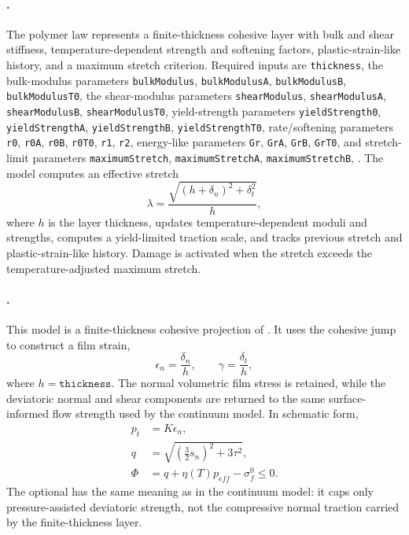 \paragraph{.}
The polymer law represents a finite-thickness cohesive layer with bulk and shear stiffness, temperature-dependent strength and softening factors, plastic-strain-like history, and a maximum stretch criterion.  Required inputs are \texttt{thickness}, the bulk-modulus parameters \texttt{bulkModulus}, \texttt{bulkModulusA}, \texttt{bulkModulusB}, \texttt{bulkModulusT0}, the shear-modulus parameters \texttt{shearModulus}, \texttt{shearModulusA}, \texttt{shearModulusB}, \texttt{shearModulusT0}, yield-strength parameters \texttt{yieldStrength0}, \texttt{yieldStrengthA}, \texttt{yieldStrengthB}, \texttt{yieldStrengthT0}, rate/softening parameters \texttt{r0}, \texttt{r0A}, \texttt{r0B}, \texttt{r0T0}, \texttt{r1}, \texttt{r2}, energy-like parameters \texttt{Gr}, \texttt{GrA}, \texttt{GrB}, \texttt{GrT0}, and stretch-limit parameters \texttt{maximumStretch}, \texttt{maximumStretchA}, \texttt{maximumStretchB}, .  The model computes an effective stretch
\begin{equation}
  \lambda = \frac{\sqrt{(h+\delta_n)^2+\delta_t^2}}{h},
  \label{eq:cz-polymer-stretch}
\end{equation}
where $h$ is the layer thickness, updates temperature-dependent moduli and strengths, computes a yield-limited traction scale, and tracks previous stretch and plastic-strain-like history.  Damage is activated when the stretch exceeds the temperature-adjusted maximum stretch.

\paragraph{.}
This model is a finite-thickness cohesive projection of .  It uses the cohesive jump to construct a film strain,
\begin{equation}
  \epsilon_n=\frac{\delta_n}{h},
  \qquad
  \gamma=\frac{\delta_t}{h},
  \label{eq:surface-polymer-cz-film-strain}
\end{equation}
where \(h=\texttt{thickness}\).  The normal volumetric film stress is retained, while the deviatoric normal and shear components are returned to the same surface-informed flow strength used by the continuum model.  In schematic form,
\begin{align}
  p_t &= K\epsilon_n,\\
  q &= \sqrt{\left(\frac{3}{2}s_n\right)^2+3\tau^2},\\
  \Phi &= q+\eta(T)p_{eff}-\sigma_f^0\le 0.
  \label{eq:surface-polymer-cz-yield}
\end{align}
The optional  has the same meaning as in the continuum model: it caps only pressure-assisted deviatoric strength, not the compressive normal traction carried by the finite-thickness layer.

